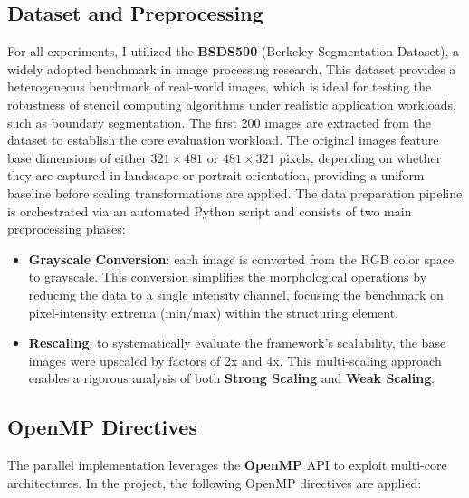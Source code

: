 \documentclass[10pt,twocolumn,letterpaper]{article}
\begin{document}
\subsection{Dataset and Preprocessing}
For all experiments, I utilized the \textbf{BSDS500} (Berkeley Segmentation Dataset), a widely adopted benchmark in image processing research. This dataset provides a heterogeneous benchmark of real-world images, which is ideal for testing the robustness of stencil computing algorithms under realistic application workloads, such as boundary segmentation.
The first 200 images are extracted from the dataset to establish the core evaluation workload. The original images feature base dimensions of either $321 \times 481$ or $481 \times 321$ pixels, depending on whether they are captured in landscape or portrait orientation, providing a uniform baseline before scaling transformations are applied.
The data preparation pipeline is orchestrated via an automated Python script and consists of two main preprocessing phases:
\begin{itemize}
    \item \textbf{Grayscale Conversion}: each image is converted from the RGB color space to grayscale. This conversion simplifies the morphological operations by reducing the data to a single intensity channel, focusing the benchmark on pixel-intensity extrema (min/max) within the structuring element.
    \item \textbf{Rescaling}: to systematically evaluate the framework's scalability, the base images were upscaled by factors of 2x and 4x. This multi-scaling approach enables a rigorous analysis of both \textbf{Strong Scaling} and \textbf{Weak Scaling}. 
\end{itemize}

\subsection{OpenMP Directives}
The parallel implementation leverages the \textbf{OpenMP} API to exploit multi-core architectures. In the project, the following OpenMP directives are applied:
\end{document}

